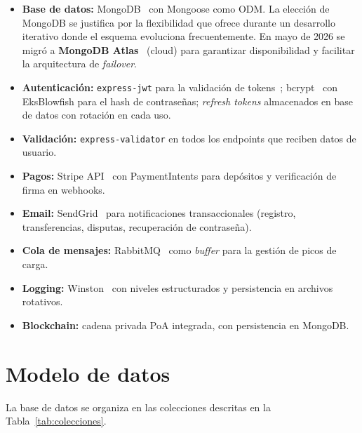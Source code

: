 \begin{itemize}
  \item \textbf{Base de datos:} MongoDB~\cite{mongodb} con Mongoose como ODM. La elección de MongoDB se justifica por la flexibilidad que ofrece durante un desarrollo iterativo donde el esquema evoluciona frecuentemente. En mayo de 2026 se migró a \textbf{MongoDB Atlas}~\cite{mongoatlas} (cloud) para garantizar disponibilidad y facilitar la arquitectura de \emph{failover}.
  \item \textbf{Autenticación:} \texttt{express-jwt} para la validación de tokens~\cite{jwt}; bcrypt~\cite{bcrypt} con EksBlowfish para el hash de contraseñas; \emph{refresh tokens} almacenados en base de datos con rotación en cada uso.
  \item \textbf{Validación:} \texttt{express-validator} en todos los endpoints que reciben datos de usuario.
  \item \textbf{Pagos:} Stripe API~\cite{stripe} con PaymentIntents para depósitos y verificación de firma en webhooks.
  \item \textbf{Email:} SendGrid~\cite{sendgrid} para notificaciones transaccionales (registro, transferencias, disputas, recuperación de contraseña).
  \item \textbf{Cola de mensajes:} RabbitMQ~\cite{rabbitmq} como \emph{buffer} para la gestión de picos de carga.
  \item \textbf{Logging:} Winston~\cite{winston} con niveles estructurados y persistencia en archivos rotativos.
  \item \textbf{Blockchain:} cadena privada PoA integrada, con persistencia en MongoDB.
\end{itemize}

\section{Modelo de datos}

La base de datos se organiza en las colecciones descritas en la Tabla~\ref{tab:colecciones}.

